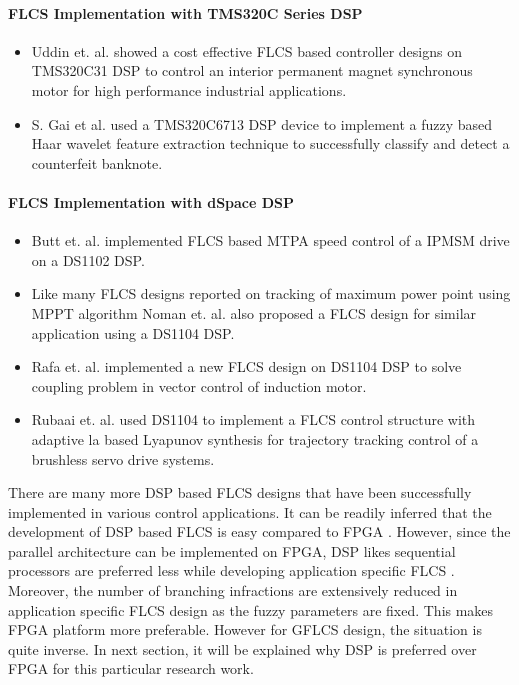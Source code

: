 \paragraph{FLCS Implementation with TMS320C Series DSP}
\begin{itemize}
	\item Uddin et. al. \cite{Uddin2007} showed a cost effective FLCS based controller designs on TMS320C31 DSP to control an interior permanent magnet synchronous motor for high performance industrial applications.
	\item S. Gai et al. \cite{Gai2010} used a TMS320C6713 DSP device to implement a fuzzy based Haar wavelet feature extraction technique to successfully classify and detect a counterfeit banknote.
\end{itemize}

\paragraph{FLCS Implementation with dSpace DSP}
\begin{itemize}
	\item Butt et. al. \cite{Butt2004} implemented FLCS based MTPA speed control of a IPMSM drive on a DS1102 DSP.
	\item Like many FLCS designs reported on tracking of maximum power point using MPPT algorithm Noman et. al. \cite{Noman2013} also proposed a FLCS design for similar application using a DS1104 DSP.
	\item Rafa et. al. \cite{Rafa2014} implemented a new FLCS design on DS1104 DSP to solve coupling problem in vector control of induction motor.
	\item Rubaai et. al. \cite{Rubaai2007} used DS1104 to implement a FLCS control structure with adaptive la based Lyapunov synthesis for trajectory tracking control of a brushless servo drive systems.
\end{itemize}

There are many more DSP based FLCS designs that have been successfully implemented in various control applications. It can be readily inferred that the development of DSP based FLCS is easy compared to FPGA \cite{Parker2010,Lall2002Xilinx,Schneiderman2014}. However, since the parallel architecture can be implemented on FPGA, DSP likes sequential processors are preferred less while developing application specific FLCS \cite{altera2007}. Moreover, the number of branching infractions are extensively reduced in application specific FLCS design as the fuzzy parameters are fixed. This makes FPGA platform more preferable. However for GFLCS design, the situation is quite inverse. In next section, it will be explained why DSP is preferred over FPGA for this particular research work.

